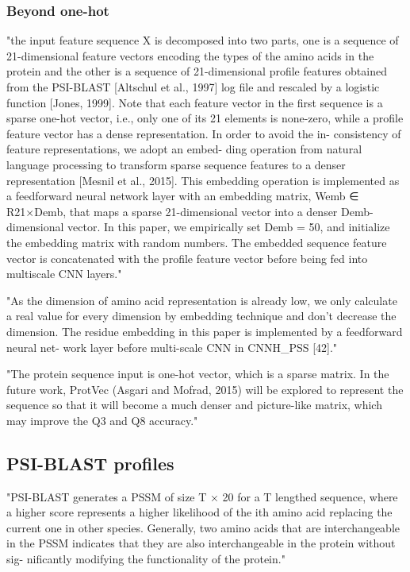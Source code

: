 \documentclass[]{scrartcl}
\begin{document}
\subsubsection{Beyond one-hot}
"the input feature sequence X is decomposed into two parts, one is a sequence of 21-dimensional feature vectors encoding the types of the amino acids in the protein and the other is a sequence of 21-dimensional profile features obtained from the PSI-BLAST [Altschul et al., 1997] log file and rescaled by a logistic function [Jones, 1999]. Note that each feature vector in the first sequence is a sparse one-hot vector, i.e., only one of its 21 elements is none-zero, while a profile feature vector has a dense representation. In order to avoid the in- consistency of feature representations, we adopt an embed- ding operation from natural language processing to transform sparse sequence features to a denser representation [Mesnil et al., 2015]. This embedding operation is implemented as a feedforward neural network layer with an embedding matrix, Wemb ∈ R21×Demb, that maps a sparse 21-dimensional vector into a denser Demb-dimensional vector. In this paper, we empirically set Demb = 50, and initialize the embedding matrix with random numbers. The embedded sequence feature vector is concatenated with the profile feature vector before being fed into multiscale CNN layers." \cite{Li2016}

"As the dimension of amino acid representation is already low, we only calculate a real value for every dimension by embedding technique and don’t decrease the dimension. The residue embedding in this paper is implemented by a feedforward neural net- work layer before multi-scale CNN in CNNH\_PSS [42]." \cite{Zhou2018}

"The protein sequence input is one-hot vector, which is a sparse matrix. In the future work, ProtVec (Asgari and Mofrad, 2015) will be explored to represent the sequence so that it will become a much denser and picture-like matrix, which may improve the Q3 and Q8 accuracy." \cite{Fang2017}

\subsection{PSI-BLAST profiles}
"PSI-BLAST generates a PSSM of size T × 20 for a T lengthed sequence, where a higher score represents a higher likelihood of the ith amino acid replacing the current one in other species. Generally, two amino acids that are interchangeable in the PSSM indicates that they are also interchangeable in the protein without sig- nificantly modifying the functionality of the protein." \cite{Lin2016}
\end{document}
